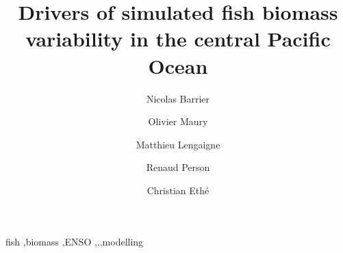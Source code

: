 \documentclass[review]{elsarticle}
\begin{document}
\begin{frontmatter}

\title{Drivers of simulated fish biomass variability in the central Pacific Ocean}

\author[mymainaddress]{Nicolas Barrier}

\author[mymainaddress]{Olivier Maury}
\author[mymainaddress]{Matthieu Lengaigne}
\author[renaud]{Renaud Person}
\author[chris]{Christian Eth\'{e}}


\address[mymainaddress]{MARBEC, Univ. Montpellier, CNRS, Ifremer, IRD, Sète, France}
\address[renaud]{LOCEAN, IRD}
\address[chris]{IPSL, CNRS}

\begin{abstract}

\end{abstract}

\begin{keyword}
fish \sep biomass \sep ENSO \sep \nino \sep \nina \sep modelling
\end{keyword}

\end{frontmatter}

\linenumbers

%
%
\newpage





%
%


\listoffigures
\listoftables

\clearpage


\end{document}
